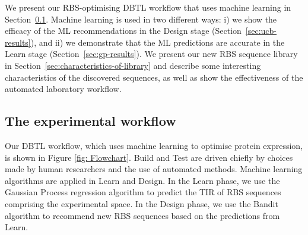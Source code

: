 \documentclass{article}
\begin{document}
We present our RBS-optimising DBTL workflow that uses machine learning in Section~\ref{sec:dbtl-workflow}.
Machine learning is used in two different ways: i) we show the efficacy of the ML recommendations
in the Design stage (Section~\ref{sec:ucb-results}),
and ii) we demonstrate that the ML predictions are accurate in the Learn stage (Section~\ref{sec:gp-results}).
We present our new RBS sequence library in Section~\ref{sec:characteristics-of-library} and describe some interesting
characteristics of the discovered sequences,
as well as show the effectiveness of the automated laboratory workflow.

\subsection{The experimental workflow}
\label{sec:dbtl-workflow}

Our DBTL workflow, which uses machine learning to optimise protein expression, is shown in Figure \ref{fig: Flowchart}.
Build and Test are driven chiefly by choices made by human researchers and the use of automated methods.
Machine learning algorithms are applied in Learn and Design.
In the Learn phase, we use the Gaussian Process regression algorithm to predict the TIR of RBS sequences comprising the experimental space.
In the Design phase, we use the Bandit algorithm to recommend new RBS sequences based on the predictions from Learn.\\
\end{document}
